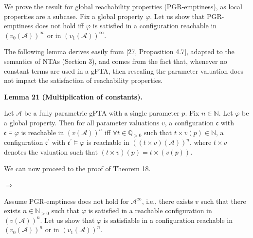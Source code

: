  
We prove the result for global reachability properties (PGR-emptiness), as local properties are a subcase. Fix a global property $\varphi$. Let us show that PGR-emptiness does not hold iff $\varphi$ is satisfied in a configuration reachable in ${(v_{0}(\mathcal{A}))}^{\infty}$ or in ${(v_{1}(\mathcal{A}))}^{\infty}$.\par
 
 
 
The following lemma derives easily from [27, Proposition 4.7], adapted to the semantics of NTAs (Section 3), and comes from the fact that, whenever no constant terms are used in a gPTA, then rescaling the parameter valuation does not impact the satisfaction of reachability properties.\par
 
 
 
\par\medskip\noindent\textbf{Lemma 21 (Multiplication of constants).}\par
 
 
Let $\mathcal{A}$ be a fully parametric gPTA with a single parameter $p$. Fix $n\in\mathbb{N}$. Let $\varphi$ be a global property. Then for all parameter valuations $v$, a configuration $\mathfrak{c}$ with $\mathfrak{c}\models\varphi$ is reachable in ${(v(\mathcal{A}))}^{n}$ iff $\forall t\in\mathbb{Q}_{>0}$ such that $t\times v(p)\in\mathbb{N}$, a configuration $\mathfrak{c}^{\prime}$ with $\mathfrak{c}^{\prime}\models\varphi$ is reachable in ${((t\times v)(\mathcal{A}))}^{n}$, where $t\times v$ denotes the valuation such that $(t\times v)(p)=t\times(v(p))$.\par
 
 
 
 
We can now proceed to the proof of Theorem 18.\par
 
 
  $\Rightarrow$  
 
Assume PGR-emptiness does not hold for ${\mathcal{A}}^{\infty}$, i.e., there exists $v$ such that there exists $n\in\mathbb{N}_{>0}$ such that $\varphi$ is satisfied in a reachable configuration in ${(v(\mathcal{A}))}^{n}$. Let us show that $\varphi$ is satisfiable in a configuration reachable in ${(v_{0}(\mathcal{A}))}^{n}$ or in ${(v_{1}(\mathcal{A}))}^{n}$.\par
 
